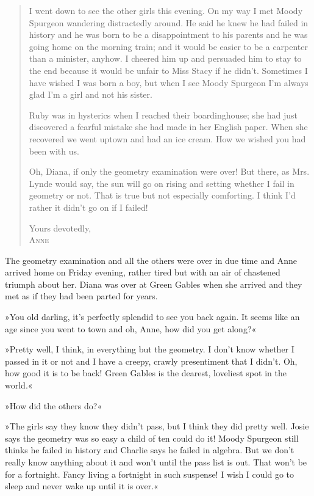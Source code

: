 \begin{quotation}
I went down to see the other girls this evening. On my way I met Moody Spurgeon wandering distractedly around. He said he knew he had failed in history and he was born to be a disappointment to his parents and he was going home on the morning train; and it would be easier to be a carpenter than a minister, anyhow. I cheered him up and persuaded him to stay to the end because it would be unfair to Miss Stacy if he didn't. Sometimes I have wished I was born a boy, but when I see Moody Spurgeon I'm always glad I'm a girl and not his sister.

Ruby was in hysterics when I reached their boardinghouse; she had just discovered a fearful mistake she had made in her English paper. When she recovered we went uptown and had an ice cream. How we wished you had been with us.

Oh, Diana, if only the geometry examination were over! But there, as Mrs. Lynde would say, the sun will go on rising and setting whether I fail in geometry or not. That is true but not especially comforting. I think I'd rather it didn't go on if I failed!
\begin{flushright}
Yours devotedly,\\
\textsc{Anne}
\end{flushright}
\end{quotation}

The geometry examination and all the others were over in due time and Anne arrived home on Friday evening, rather tired but with an air of chastened triumph about her. Diana was over at Green Gables when she arrived and they met as if they had been parted for years.

»You old darling, it's perfectly splendid to see you back again. It seems like an age since you went to town and oh, Anne, how did you get along?«

»Pretty well, I think, in everything but the geometry. I don't know whether I passed in it or not and I have a creepy, crawly presentiment that I didn't. Oh, how good it is to be back! Green Gables is the dearest, loveliest spot in the world.«

»How did the others do?«

»The girls say they know they didn't pass, but I think they did pretty well. Josie says the geometry was so easy a child of ten could do it! Moody Spurgeon still thinks he failed in history and Charlie says he failed in algebra. But we don't really know anything about it and won't until the pass list is out. That won't be for a fortnight. Fancy living a fortnight in such suspense! I wish I could go to sleep and never wake up until it is over.«

